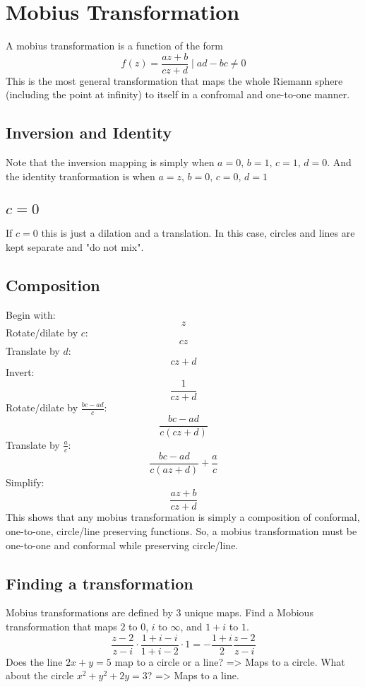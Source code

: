 \documentclass[../main.tex]{subfiles}
\begin{document}
\section{Mobius Transformation}
    A mobius transformation is a function of the form $$f(z)=\frac{az+b}{cz+d}\mid ad-bc\neq 0$$
    This is the most general transformation that maps the whole Riemann sphere (including the point at infinity) to itself in a confromal and one-to-one manner.
    \subsection{Inversion and Identity}
        Note that the inversion mapping is simply when $a=0,\, b=1,\, c=1,\, d=0$. And the identity tranformation is when $a=z,\, b=0,\, c=0,\, d=1$
    \subsection{$c=0$}
        If $c=0$ this is just a dilation and a translation. In this case, circles and lines are kept separate and "do not mix".
    \subsection{Composition}
        Begin with:
        $$z$$
        Rotate/dilate by $c$:
        $$cz$$
        Translate by $d$:
        $$cz+d$$
        Invert:
        $$\frac{1}{cz+d}$$
        Rotate/dilate by $\frac{bc-ad}{c}$:
        $$\frac{bc-ad}{c(cz+d)}$$
        Translate by $\frac{a}{c}$:
        $$\frac{bc-ad}{c(az+d)}+\frac{a}{c}$$
        Simplify:
        $$\frac{az+b}{cz+d}$$
        This shows that any mobius transformation is simply a composition of conformal, one-to-one, circle/line preserving functions. So, a mobius transformation must be 
        one-to-one and conformal while preserving circle/line.

    \subsection{Finding a transformation}
        Mobius transformations are defined by 3 unique maps.
        Find a Mobious transformation that maps $2$ to $0$, $i$ to $\infty$, and $1+i$ to $1$. 
        $$\frac{z-2}{z-i}\cdot\frac{1+i-i}{1+i-2}\cdot 1 = -\frac{1+i}{2}\frac{z-2}{z-i}$$
        Does the line $2x+y=5$ map to a circle or a line? => Maps to a circle.
        What about the circle $x^{2}+y^{2}+2y=3$? => Maps to a line.
\end{document}
